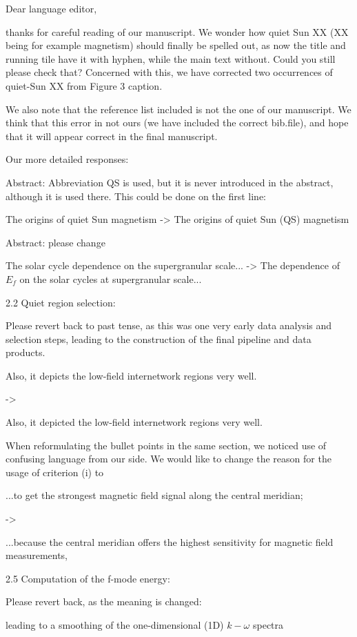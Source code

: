 
Dear language editor,

thanks for careful reading of our manuscript. We wonder how
quiet Sun XX (XX being for example magnetism) should finally be spelled out, as now the title and running tile have it with hyphen, while the main text without. Could you still please check that? Concerned with this, we have corrected two occurrences of quiet-Sun XX from Figure 3 caption.

We also note that the reference list included is not the one of our manuscript. We think that this error in not ours (we have included the correct bib.file), and hope that it will appear correct in the final manuscript.

Our more detailed responses:

Abstract: Abbreviation QS is used, but it is never introduced in the abstract, although it is used there. This could be done on the first line:

The origins of quiet Sun magnetism -> The origins of quiet Sun (QS) magnetism 

Abstract: please change

The solar cycle dependence on the supergranular scale...
->
The dependence of $E_f$ on the solar cycles at supergranular scale...

2.2 Quiet region selection:

Please revert back to past tense, as this was one very early data
analysis and selection steps, leading to the construction of the final
pipeline and data products.

Also, it depicts the low-field internetwork regions very well.

->

Also, it depicted the low-field internetwork regions very well.

When reformulating the bullet points in the same section, we noticed use of confusing language from our side. We would like to change the reason for the usage of criterion (i) to

...to get the strongest magnetic field signal along the central meridian; 

->

...because the central meridian offers the highest sensitivity for magnetic field measurements,

2.5 Computation of the f-mode energy:

Please revert back, as the meaning is changed:

leading to a smoothing of the one-dimensional (1D) $k-\omega$ spectra

